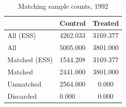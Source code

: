 \begin{table}

\caption{\label{tab:psm}Matching sample counts, 1992}
\centering
\begin{tabular}[t]{llc}
\toprule
  & Control & Treated\\
\midrule
All (ESS) & 4262.033 & 3169.377\\
All & 5005.000 & 3801.000\\
Matched (ESS) & 1544.208 & 3169.377\\
Matched & 2441.000 & 3801.000\\
Unmatched & 2564.000 & 0.000\\
\addlinespace
Discarded & 0.000 & 0.000\\
\bottomrule
\end{tabular}
\end{table}
